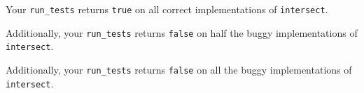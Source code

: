 \enlargethispage{5ex}
\begin{part}\onePT[2.2ex]
Your \lstinline'run_tests' returns \lstinline'true' on all correct
implementations of \lstinline'intersect'.
\end{part}

\begin{part}\twoPT[2.3ex]
Additionally, your \lstinline'run_tests' returns \lstinline'false' on
half the buggy implementations of \lstinline'intersect'.
\end{part}

\begin{part}\threePT[2.3ex]
Additionally, your \lstinline'run_tests' returns \lstinline'false' on
all the buggy implementations of \lstinline'intersect'.
\end{part}

